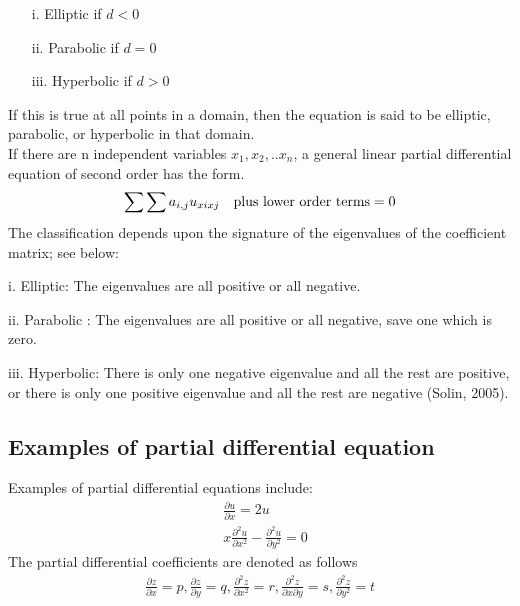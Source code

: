 \documentclass[12pt]{report}
\begin{document}
\begin{enumerate}
	\item[i.] Elliptic if $d<0$
	\item[ii.] Parabolic if $d=0$
	\item[iii.] Hyperbolic if $d>0$
\end{enumerate}

If this is true at all points in a domain, then the equation is said to be elliptic, parabolic, or hyperbolic
in that domain.\\
If there are n independent variables $x_1, x_2, ..x_n$, a general linear partial differential equation of second order has the form.\\
\begin{equation*}
\sum \sum a_{i,j}u_{xixj} \quad \text{plus lower order terms} = 0 \\
\end{equation*}
The classification depends upon the signature of the eigenvalues of the coefficient matrix; see below: \\
\begin{enumerate*}
	\item i. Elliptic: The eigenvalues are all positive or all
	negative.
	\item ii. Parabolic : The eigenvalues are all positive or all negative, save one which is zero.
	\item iii. Hyperbolic: There is only one negative eigenvalue and all the rest are positive, or
	there is only one positive eigenvalue and all the rest are negative (Solin, 2005).
\end{enumerate*}

\subsection {Examples of partial differential equation}
Examples of partial differential equations include:
\begin{align*}
& \frac{\partial u}{\partial x}=2u \\
& x \frac{\partial^2u}{\partial x^2}-\frac{\partial^2u}{\partial y^2}=0
\end{align*}
The partial differential coefficients are denoted as follows
\begin{align*}
 \frac{\partial z}{\partial x}=p, \frac{\partial z}{\partial y}=q, \frac{\partial^2z}{\partial x^2}=r,
\frac{\partial^2z}{\partial x \partial y}=s, \frac{\partial^2z}{\partial y^2}=t
\end{align*}
\end{document}
